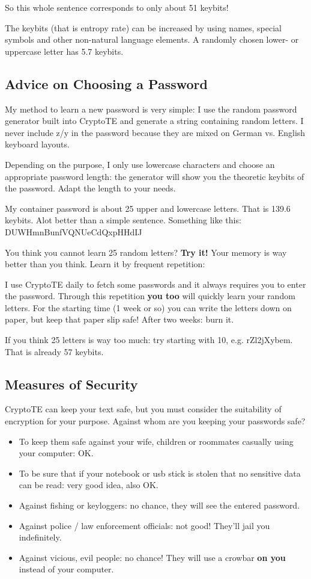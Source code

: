 \documentclass[a4paper,12pt,twoside]{article}
\begin{document}
So this whole sentence corresponds to only about 51 keybits!

The keybits (that is entropy rate) can be increased by using names, special symbols and other non-natural language elements. A randomly chosen lower- or uppercase letter has 5.7 keybits.

\subsection{Advice on Choosing a Password}\label{AdvicePassword}

My method to learn a new password is very simple: I use the random password generator built into CryptoTE and generate a string containing random letters. I never include z/y in the password because they are mixed on German vs. English keyboard layouts.

Depending on the purpose, I only use lowercase characters and choose an appropriate password length: the generator will show you the theoretic keybits of the password. Adapt the length to your needs.

My container password is about 25 upper and lowercase letters. That is 139.6 keybits. Alot better than a simple sentence. Something like this: DUWHmnBunfVQNUeCdQxpHHdIJ

You think you cannot learn 25 random letters? \textbf{Try it!} Your memory is way better than you think. Learn it by frequent repetition:

I use CryptoTE daily to fetch some passwords and it always requires you to enter the password. Through this repetition \textbf{you too} will quickly learn your random letters. For the starting time (1 week or so) you can write the letters down on paper, but keep that paper slip safe! After two weeks: burn it.

If you think 25 letters is way too much: try starting with 10, e.g. rZl2jXybem. That is already 57 keybits.

\subsection{Measures of Security}\label{MeasuresSecurity}

CryptoTE can keep your text safe, but you must consider the suitability of encryption for your purpose. Against whom are you keeping your passwords safe?

\begin{itemize}
  \item To keep them safe against your wife, children or roommates casually using your computer: OK.
  \item To be sure that if your notebook or usb stick is stolen that no sensitive data can be read: very good idea, also OK.
  \item Against fishing or keyloggers: no chance, they will see the entered password.
  \item Against police / law enforcement officials: not good! They'll jail you indefinitely.
  \item Against vicious, evil people: no chance! They will use a crowbar \textbf{on you} instead of your computer.
\end{itemize}
\end{document}
